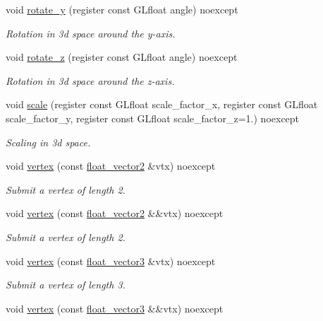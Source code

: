 \begin{DoxyCompactItemize}
void \hyperlink{namespaceglpp_a730d2b64f2390ffef365de9b281a1e7f}{rotate\+\_\+y} (register const G\+Lfloat angle) noexcept
\begin{DoxyCompactList}\small\item\em Rotation in 3d space around the y-\/axis. \end{DoxyCompactList}\item 
void \hyperlink{namespaceglpp_a9c36888e2f7b0c830ec129188ac528d1}{rotate\+\_\+z} (register const G\+Lfloat angle) noexcept
\begin{DoxyCompactList}\small\item\em Rotation in 3d space around the z-\/axis. \end{DoxyCompactList}\item 
void \hyperlink{namespaceglpp_a8f41fadccf7a19f4dba07f43bb9d9104}{scale} (register const G\+Lfloat scale\+\_\+factor\+\_\+x, register const G\+Lfloat scale\+\_\+factor\+\_\+y, register const G\+Lfloat scale\+\_\+factor\+\_\+z=1.) noexcept
\begin{DoxyCompactList}\small\item\em Scaling in 3d space. \end{DoxyCompactList}\item 
void \hyperlink{namespaceglpp_a22c47481e72fb67ddeeb6aa0c37ca93f}{vertex} (const \hyperlink{namespaceglpp_ace2f7da7495fc7d1623d97a444c87146}{float\+\_\+vector2} \&vtx) noexcept
\begin{DoxyCompactList}\small\item\em Submit a vertex of length 2. \end{DoxyCompactList}\item 
void \hyperlink{namespaceglpp_ab739a17e9e588957b21d938df042524b}{vertex} (const \hyperlink{namespaceglpp_ace2f7da7495fc7d1623d97a444c87146}{float\+\_\+vector2} \&\&vtx) noexcept
\begin{DoxyCompactList}\small\item\em Submit a vertex of length 2. \end{DoxyCompactList}\item 
void \hyperlink{namespaceglpp_a4e4c9b6702745dbcbf1fa0b2e05b6576}{vertex} (const \hyperlink{namespaceglpp_a3fa7b207a8b7dba583fb22731a616d73}{float\+\_\+vector3} \&vtx) noexcept
\begin{DoxyCompactList}\small\item\em Submit a vertex of length 3. \end{DoxyCompactList}\item 
void \hyperlink{namespaceglpp_af652cd46d89c12c1c32c0737421defbf}{vertex} (const \hyperlink{namespaceglpp_a3fa7b207a8b7dba583fb22731a616d73}{float\+\_\+vector3} \&\&vtx) noexcept

\end{DoxyCompactItemize}

